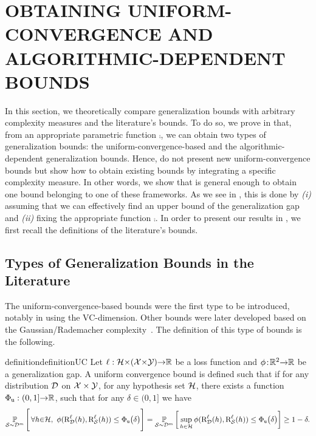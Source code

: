\documentclass[twoside]{article}
\theoremstyle{plain}
\begin{document}
\section{OBTAINING UNIFORM-CONVERGENCE AND ALGORITHMIC-DEPENDENT BOUNDS}
\label{sec:comparison-uc-algo}

In this section, we theoretically compare generalization bounds with arbitrary complexity measures and the literature's bounds.
To do so, we prove in  that, from an appropriate parametric function $\comp$, we can obtain two types of generalization bounds: the uniform-convergence-based and the algorithmic-dependent generalization bounds.
Hence,  do not present new uniform-convergence bounds but show how to obtain existing bounds by integrating a specific complexity measure.
In other words, we show that  is general enough to obtain one bound belonging to one of these frameworks.
As we see in , this is done by {\it (i)} assuming that we can effectively find an upper bound of the generalization gap and {\it (ii)} fixing the appropriate function $\comp$.
In order to present our results in , we first recall the definitions of the literature's bounds.

\subsection{Types of Generalization Bounds in the Literature}

The uniform-convergence-based bounds were the first type to be introduced, notably in \citet{vapnik1971uniform} using the VC-dimension.
Other bounds were later developed based on the Gaussian/Rademacher complexity~\citep{bartlett2002rademacher}.
The definition of this type of bounds is the following.

\begin{restatable}{definition}{definitionUC}\label{def:uc}
Let $\ell: \mathcal{H}{\times}(\mathcal{X}{\times}\mathcal{Y}){\to}\mathbb{R}$ be a loss function and $\phi\!:\! \mathbb{R}^2{\to}\mathbb{R}$ be a generalization gap.
A uniform convergence bound is defined such that if for any distribution $\mathcal{D}$ on $\mathcal{X}\times\mathcal{Y}$, for any hypothesis set $\mathcal{H}$, there exists a function $\Phi_{{\tt u}}: (0,1]{\to} \mathbb{R}$, such that for any  $\delta\in(0, 1]$ we have
\begin{align}
\PP_{\Scal\sim\Dcal^{m}}\Bigg[\, \forall h{\in}\Hcal,\ \phi(\RiskLoss_{\Dcal}(h),\RiskLoss_{\Scal}(h)) \le \PhiUC\big(\delta\big) \Bigg] = \PP_{\Scal\sim\Dcal^{m}}\LB\, \sup_{h\in\Hcal} \phi(\RiskLoss_{\Dcal}(h),\RiskLoss_{\Scal}(h)) \le \PhiUC\big(\delta\big) \RB\ge 1-\delta.\label{eq:uc}
\end{align}
\end{restatable}
\end{document}
